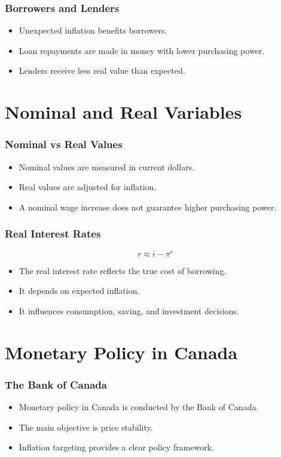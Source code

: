 \documentclass[aspectratio=169]{beamer}
\begin{document}
\begin{frame}
\transfade
\frametitle{Borrowers and Lenders}
\begin{itemize}
\item Unexpected inflation benefits borrowers.
\item Loan repayments are made in money with lower purchasing power.
\item Lenders receive less real value than expected.
\end{itemize}
\end{frame}

\section{Nominal and Real Variables}

\begin{frame}
\transfade
\frametitle{Nominal vs Real Values}
\begin{itemize}
\item Nominal values are measured in current dollars.
\item Real values are adjusted for inflation.
\item A nominal wage increase does not guarantee higher purchasing power.
\end{itemize}
\end{frame}

\begin{frame}
\transfade
\frametitle{Real Interest Rates}
\[
r \approx i - \pi^e
\]
\begin{itemize}
\item The real interest rate reflects the true cost of borrowing.
\item It depends on expected inflation.
\item It influences consumption, saving, and investment decisions.
\end{itemize}
\end{frame}

\section{Monetary Policy in Canada}

\begin{frame}
\transfade
\frametitle{The Bank of Canada}
\begin{itemize}
\item Monetary policy in Canada is conducted by the Bank of Canada.
\item The main objective is price stability.
\item Inflation targeting provides a clear policy framework.
\end{itemize}
\end{frame}
\end{document}

